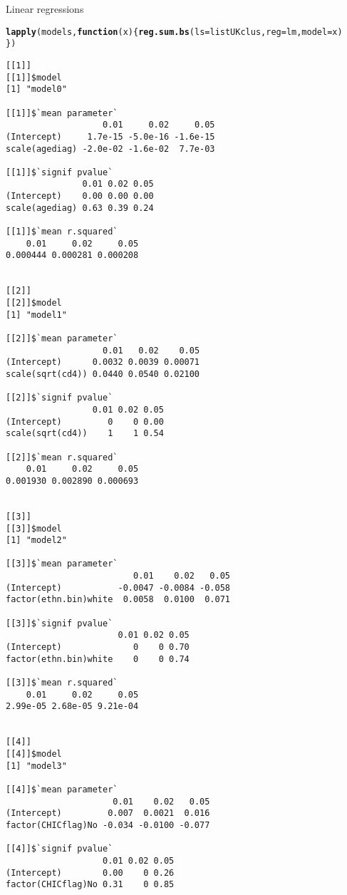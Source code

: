 \documentclass[]{revtex4}\usepackage[]{graphicx}\usepackage[]{color}
\makeatletter
\newcommand{\hlstd}[1]{\textcolor[rgb]{0.345,0.345,0.345}{#1}}%
\newcommand{\hlkwa}[1]{\textcolor[rgb]{0.161,0.373,0.58}{\textbf{#1}}}%
\newcommand{\hlkwc}[1]{\textcolor[rgb]{0.333,0.667,0.333}{#1}}%
\newcommand{\hlkwd}[1]{\textcolor[rgb]{0.737,0.353,0.396}{\textbf{#1}}}%
\newenvironment{kframe}{%
 \def\at@end@of@kframe{}%
 \ifinner\ifhmode%
  \def\at@end@of@kframe{\end{minipage}}%
  \begin{minipage}{\columnwidth}%
 \fi\fi%
 \def\FrameCommand##1{\hskip\@totalleftmargin \hskip-\fboxsep
 \colorbox{shadecolor}{##1}\hskip-\fboxsep
     \hskip-\linewidth \hskip-\@totalleftmargin \hskip\columnwidth}%
 \MakeFramed {\advance\hsize-\width
   \@totalleftmargin\z@ \linewidth\hsize
   \@setminipage}}%
 {\par\unskip\endMakeFramed%
 \at@end@of@kframe}
\newenvironment{knitrout}{}{} %
\makeatother
\begin{document}
Linear regressions
\begin{knitrout}
\color{fgcolor}\begin{kframe}
\begin{alltt}
\hlkwd{lapply}\hlstd{(models,} \hlkwa{function}\hlstd{(}\hlkwc{x}\hlstd{) \{}\hlkwd{reg.sum.bs}\hlstd{(}\hlkwc{ls} \hlstd{= listUKclus,} \hlkwc{reg} \hlstd{= lm,} \hlkwc{model} \hlstd{= x)}
  \hlstd{\})}
\end{alltt}
\begin{verbatim}
[[1]]
[[1]]$model
[1] "model0"

[[1]]$`mean parameter`
                   0.01     0.02     0.05
(Intercept)     1.7e-15 -5.0e-16 -1.6e-15
scale(agediag) -2.0e-02 -1.6e-02  7.7e-03

[[1]]$`signif pvalue`
               0.01 0.02 0.05
(Intercept)    0.00 0.00 0.00
scale(agediag) 0.63 0.39 0.24

[[1]]$`mean r.squared`
    0.01     0.02     0.05 
0.000444 0.000281 0.000208 


[[2]]
[[2]]$model
[1] "model1"

[[2]]$`mean parameter`
                   0.01   0.02    0.05
(Intercept)      0.0032 0.0039 0.00071
scale(sqrt(cd4)) 0.0440 0.0540 0.02100

[[2]]$`signif pvalue`
                 0.01 0.02 0.05
(Intercept)         0    0 0.00
scale(sqrt(cd4))    1    1 0.54

[[2]]$`mean r.squared`
    0.01     0.02     0.05 
0.001930 0.002890 0.000693 


[[3]]
[[3]]$model
[1] "model2"

[[3]]$`mean parameter`
                         0.01    0.02   0.05
(Intercept)           -0.0047 -0.0084 -0.058
factor(ethn.bin)white  0.0058  0.0100  0.071

[[3]]$`signif pvalue`
                      0.01 0.02 0.05
(Intercept)              0    0 0.70
factor(ethn.bin)white    0    0 0.74

[[3]]$`mean r.squared`
    0.01     0.02     0.05 
2.99e-05 2.68e-05 9.21e-04 


[[4]]
[[4]]$model
[1] "model3"

[[4]]$`mean parameter`
                     0.01    0.02   0.05
(Intercept)         0.007  0.0021  0.016
factor(CHICflag)No -0.034 -0.0100 -0.077

[[4]]$`signif pvalue`
                   0.01 0.02 0.05
(Intercept)        0.00    0 0.26
factor(CHICflag)No 0.31    0 0.85


\end{verbatim}
\end{kframe}
\end{knitrout}
\end{document}
